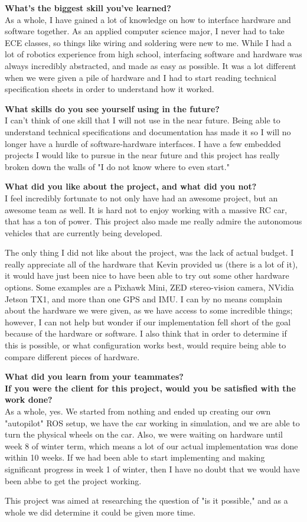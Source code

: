 \documentclass[compsoc,draftclsnofoot,onecolumn,10pt]{IEEEtran}
\begin{document}
\textbf{What's the biggest skill you've learned?}\\
As a whole, I have gained a lot of knowledge on how to interface hardware and software together. As an applied computer science major, I never had to take ECE classes, so things like wiring and soldering were new to me. While I had a lot of robotics experience from high school, interfacing software and hardware was always incredibly abstracted, and made as easy as possible. It was a lot different when we were given a pile of hardware and I had to start reading technical specification sheets in order to understand how it worked. 

\textbf{What skills do you see yourself using in the future?}\\
I can't think of one skill that I will not use in the near future. Being able to understand technical specifications and documentation has made it so I will no longer have a hurdle of software-hardware interfaces. I have a few embedded projects I would like to pursue in the near future and this project has really broken down the walls of "I do not know where to even start." 

\textbf{What did you like about the project, and what did you not?}\\
I feel incredibly fortunate to not only have had an awesome project, but an awesome team as well. It is hard not to enjoy working with a massive RC car, that has a ton of power. This project also made me really admire the autonomous vehicles that are currently being developed. \par
The only thing I did not like about the project, was the lack of actual budget. I really appreciate all of the hardware that Kevin provided us (there is a lot of it), it would have just been nice to have been able to try out some other hardware options. Some examples are a Pixhawk Mini, ZED stereo-vision camera, NVidia Jetson TX1, and more than one GPS and IMU. I can by no means complain about the hardware we were given, as we have access to some incredible things; however, I can not help but wonder if our implementation fell short of the goal because of the hardware or software. I also think that in order to determine if this is possible, or what configuration works best, would require being able to compare different pieces of hardware. 

\textbf{What did you learn from your teammates?}\\


\textbf{If you were the client for this project, would you be satisfied with the work done?}\\
As a whole, yes. We started from nothing and ended up creating our own "autopilot" ROS setup, we have the car working in simulation, and we are able to turn the physical wheels on the car. Also, we were waiting on hardware until week 8 of winter term, which means a lot of our actual implementation was done within 10 weeks. If we had been able to start implementing and making significant progress in week 1 of winter, then I have no doubt that we would have been abbe to get the project working. \par
This project was aimed at researching the question of "is it possible," and as a whole we did determine it could be given more time. 
\end{document}
